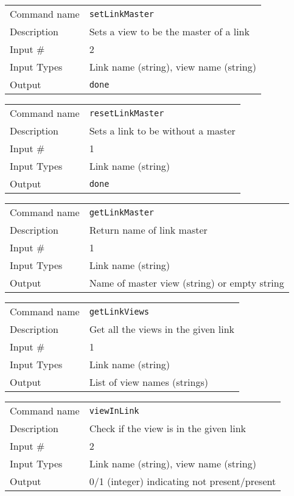 \bigskip

\noindent
\begin{tabular}{l|p{5in}}
\hline
Command name & {\tt setLinkMaster} \\
Description  & Sets a view to be the master of a link \\
Input \#     & 2 \\
Input Types  & Link name (string), view name (string) \\
Output       & {\tt done} \\
\hline
\end{tabular}

\bigskip

\noindent
\begin{tabular}{l|p{5in}}
\hline
Command name & {\tt resetLinkMaster} \\
Description  & Sets a link to be without a master \\
Input \#     & 1 \\
Input Types  & Link name (string) \\
Output       & {\tt done} \\
\hline
\end{tabular}

\bigskip

\noindent
\begin{tabular}{l|p{5in}}
\hline
Command name & {\tt getLinkMaster} \\
Description  & Return name of link master \\
Input \#     & 1 \\
Input Types  & Link name (string) \\
Output       & Name of master view (string) or empty string \\
\hline
\end{tabular}

\bigskip

\noindent
\begin{tabular}{l|p{5in}}
\hline
Command name & {\tt getLinkViews} \\
Description  & Get all the views in the given link \\
Input \#     & 1 \\
Input Types  & Link name (string) \\
Output       & List of view names (strings) \\
\hline
\end{tabular}

\bigskip

\noindent
\begin{tabular}{l|p{5in}}
\hline
Command name & {\tt viewInLink} \\
Description  & Check if the view is in the given link \\
Input \#     & 2 \\
Input Types  & Link name (string), view name (string) \\
Output       & 0/1 (integer) indicating not present/present \\
\hline
\end{tabular}

